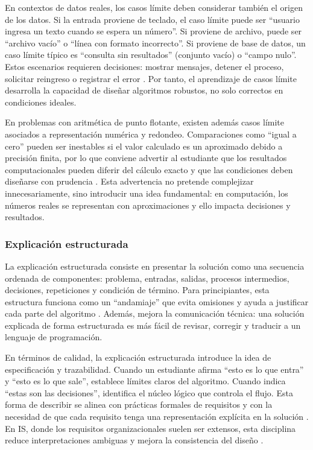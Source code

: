 \documentclass[12pt,twoside]{book}
\begin{document}
						En contextos de datos reales, los casos límite deben considerar también el origen de los datos. Si la entrada proviene de teclado, el caso límite puede ser “usuario ingresa un texto cuando se espera un número”. Si proviene de archivo, puede ser “archivo vacío” o “línea con formato incorrecto”. Si proviene de base de datos, un caso límite típico es “consulta sin resultados” (conjunto vacío) o “campo nulo”. Estos escenarios requieren decisiones: mostrar mensajes, detener el proceso, solicitar reingreso o registrar el error \cite{Silberschatz2020Database,Elmasri2016Database}. Por tanto, el aprendizaje de casos límite desarrolla la capacidad de diseñar algoritmos robustos, no solo correctos en condiciones ideales.
						
						En problemas con aritmética de punto flotante, existen además casos límite asociados a representación numérica y redondeo. Comparaciones como “igual a cero” pueden ser inestables si el valor calculado es un aproximado debido a precisión finita, por lo que conviene advertir al estudiante que los resultados computacionales pueden diferir del cálculo exacto y que las condiciones deben diseñarse con prudencia \cite{Goldberg1991What,IEEE2019Standard754}. Esta advertencia no pretende complejizar innecesariamente, sino introducir una idea fundamental: en computación, los números reales se representan con aproximaciones y ello impacta decisiones y resultados.
						
					\subsubsection{Explicación estructurada}
						\noindent
						La explicación estructurada consiste en presentar la solución como una secuencia ordenada de componentes: problema, entradas, salidas, procesos intermedios, decisiones, repeticiones y condición de término. Para principiantes, esta estructura funciona como un “andamiaje” que evita omisiones y ayuda a justificar cada parte del algoritmo \cite{Farrell2018Programming,Gaddis2022Starting}. Además, mejora la comunicación técnica: una solución explicada de forma estructurada es más fácil de revisar, corregir y traducir a un lenguaje de programación.
						
						En términos de calidad, la explicación estructurada introduce la idea de especificación y trazabilidad. Cuando un estudiante afirma “esto es lo que entra” y “esto es lo que sale”, establece límites claros del algoritmo. Cuando indica “estas son las decisiones”, identifica el núcleo lógico que controla el flujo. Esta forma de describir se alinea con prácticas formales de requisitos y con la necesidad de que cada requisito tenga una representación explícita en la solución \cite{ISOIECIEEE2018Requirements,Pressman2019Software}. En IS, donde los requisitos organizacionales suelen ser extensos, esta disciplina reduce interpretaciones ambiguas y mejora la consistencia del diseño \cite{Kendall2014Systems,Laudon2020Management}.
						
\end{document}
